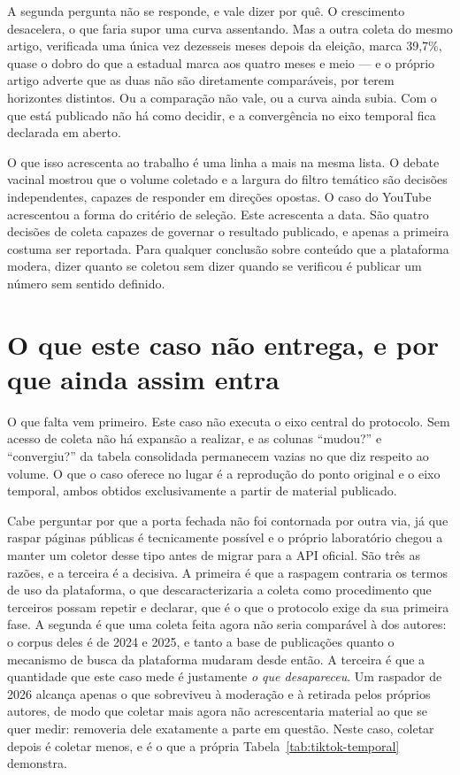 A segunda pergunta não se responde, e vale dizer por quê. O crescimento desacelera, o
que faria supor uma curva assentando. Mas a outra coleta do mesmo artigo, verificada uma
única vez dezesseis meses depois da eleição, marca 39,7\%, quase o dobro do que a
estadual marca aos quatro meses e meio --- e o próprio artigo adverte que as duas não
são diretamente comparáveis, por terem horizontes distintos. Ou a comparação não vale,
ou a curva ainda subia. Com o que está publicado não há como decidir, e a convergência
no eixo temporal fica declarada em aberto.

O que isso acrescenta ao trabalho é uma linha a mais na mesma lista. O debate vacinal
mostrou que o volume coletado e a largura do filtro temático são decisões independentes,
capazes de responder em direções opostas. O caso do YouTube acrescentou a forma do
critério de seleção. Este acrescenta a data. São quatro decisões de coleta capazes de
governar o resultado publicado, e apenas a primeira costuma ser reportada. Para
qualquer conclusão sobre conteúdo que a plataforma modera, dizer quanto se coletou sem
dizer quando se verificou é publicar um número sem sentido definido.

\section{O que este caso não entrega, e por que ainda assim entra}
\label{sec:tiktok-nao-entrega}

O que falta vem primeiro. Este caso não executa o eixo central do protocolo. Sem
acesso de coleta não há expansão a realizar, e as colunas ``mudou?'' e
``convergiu?'' da tabela consolidada permanecem vazias no que diz respeito ao
volume. O que o caso oferece no lugar é a reprodução do ponto original e o eixo
temporal, ambos obtidos exclusivamente a partir de material publicado.

Cabe perguntar por que a porta fechada não foi contornada por outra via, já que
raspar páginas públicas é tecnicamente possível e o próprio laboratório chegou a
manter um coletor desse tipo antes de migrar para a API oficial. São três as
razões, e a terceira é a decisiva. A primeira é que a raspagem contraria os termos
de uso da plataforma, o que descaracterizaria a coleta como procedimento que
terceiros possam repetir e declarar, que é o que o protocolo exige da sua primeira
fase. A segunda é que uma coleta feita agora não seria comparável à dos autores: o
corpus deles é de 2024 e 2025, e tanto a base de publicações quanto o mecanismo de
busca da plataforma mudaram desde então. A terceira é que a quantidade que este
caso mede é justamente \emph{o que desapareceu}. Um raspador de 2026 alcança apenas
o que sobreviveu à moderação e à retirada pelos próprios autores, de modo que
coletar mais agora não acrescentaria material ao que se quer medir: removeria dele
exatamente a parte em questão. Neste caso, coletar depois é coletar menos, e é o
que a própria Tabela~\ref{tab:tiktok-temporal} demonstra.

